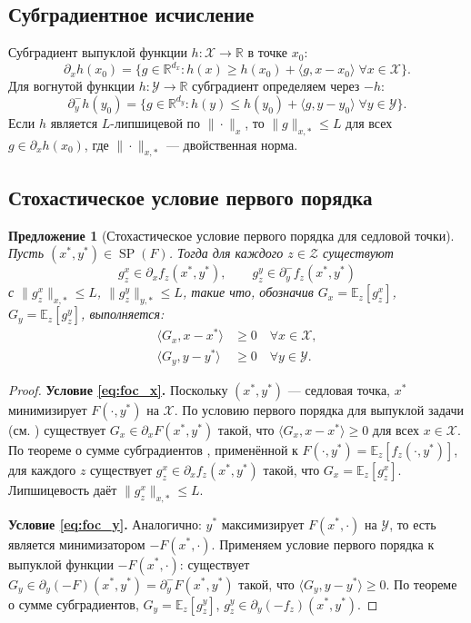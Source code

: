 \documentclass[12pt,a4paper]{article}
\theoremstyle{plain}
\newtheorem{proposition}[theorem]{Предложение}
\theoremstyle{definition}
\DeclareMathOperator{\SP}{SP}
\newcommand{\E}{\mathbb{E}}
\newcommand{\R}{\mathbb{R}}
\newcommand{\cX}{\mathcal{X}}
\newcommand{\cY}{\mathcal{Y}}
\newcommand{\cZ}{\mathcal{Z}}
\begin{document}
\subsection{Субградиентное исчисление}

Субградиент выпуклой функции $h:\cX\to\R$ в точке $x_0$:
\[
    \partial_x h(x_0)=\{g\in\R^{d_x}:h(x)\ge h(x_0)+\langle g,x-x_0\rangle\;\forall x\in\cX\}.
\]
Для вогнутой функции $h:\cY\to\R$ субградиент определяем через $-h$:
\[
    \partial_y^- h(y_0)=\{g\in\R^{d_y}:h(y)\le h(y_0)+\langle g,y-y_0\rangle\;\forall y\in\cY\}.
\]
Если $h$ является $L$-липшицевой по $\|\cdot\|_x$, то $\|g\|_{x,*}\le L$ для всех $g\in\partial_x h(x_0)$, где $\|\cdot\|_{x,*}$ --- двойственная норма.

\subsection{Стохастическое условие первого порядка}

\begin{proposition}[Стохастическое условие первого порядка для седловой точки]
\label{prop:firstorder}
Пусть $(x^*,y^*)\in\SP(F)$. Тогда для каждого $z\in\cZ$ существуют
\[
    g_z^x\in\partial_x f_z(x^*,y^*),\qquad g_z^y\in\partial_y^- f_z(x^*,y^*)
\]
с $\|g_z^x\|_{x,*}\le L$, $\|g_z^y\|_{y,*}\le L$, такие что, обозначив
$G_x=\E_z[g_z^x]$, $G_y=\E_z[g_z^y]$, выполняется:
\begin{align}
    \langle G_x,x-x^*\rangle&\ge 0\quad\forall x\in\cX, \label{eq:foc_x}\\
    \langle G_y,y-y^*\rangle&\ge 0\quad\forall y\in\cY. \label{eq:foc_y}
\end{align}
\end{proposition}

\begin{proof}
\textbf{Условие \eqref{eq:foc_x}.} Поскольку $(x^*,y^*)$ --- седловая точка, $x^*$ минимизирует $F(\cdot,y^*)$ на $\cX$. По условию первого порядка для выпуклой задачи (см. \cite{Rockafellar1997}) существует $G_x\in\partial_x F(x^*,y^*)$ такой, что $\langle G_x,x-x^*\rangle\ge 0$ для всех $x\in\cX$. По теореме о сумме субградиентов \cite{Rockafellar1997}, применённой к $F(\cdot,y^*)=\E_z[f_z(\cdot,y^*)]$, для каждого $z$ существует $g_z^x\in\partial_x f_z(x^*,y^*)$ такой, что $G_x=\E_z[g_z^x]$. Липшицевость даёт $\|g_z^x\|_{x,*}\le L$.

\textbf{Условие \eqref{eq:foc_y}.} Аналогично: $y^*$ максимизирует $F(x^*,\cdot)$ на $\cY$, то есть является минимизатором $-F(x^*,\cdot)$. Применяем условие первого порядка к выпуклой функции $-F(x^*,\cdot)$: существует $G_y\in\partial_y(-F)(x^*,y^*)=\partial_y^- F(x^*,y^*)$ такой, что $\langle G_y,y-y^*\rangle\ge 0$. По теореме о сумме субградиентов, $G_y=\E_z[g_z^y]$, $g_z^y\in\partial_y(-f_z)(x^*,y^*)$.
\end{proof}
\end{document}
